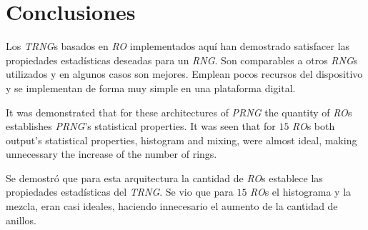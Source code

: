 \section{Conclusiones}
\label{sec:conclusions}

Los \emph{TRNG}s basados en \emph{RO} implementados aquí han demostrado satisfacer las propiedades estadísticas deseadas para un \emph{RNG}.
Son comparables a otros \emph{RNG}s utilizados y en algunos casos son mejores.
Emplean pocos recursos del dispositivo y se implementan de forma muy simple en una plataforma digital.

It was demonstrated that for these architectures of \emph{PRNG} the quantity of
\emph{RO}s establishes \emph{PRNG}'s statistical properties. It was seen that
for $15$ \emph{RO}s both output's statistical properties, histogram
and mixing, were almost ideal, making unnecessary the increase of the number of rings.

Se demostró que para esta arquitectura la cantidad de \emph{RO}s establece las propiedades estadísticas del \emph{TRNG}.
Se vio que para $15$ \emph{RO}s el histograma y la mezcla, eran casi ideales, haciendo innecesario el aumento de la cantidad de anillos.